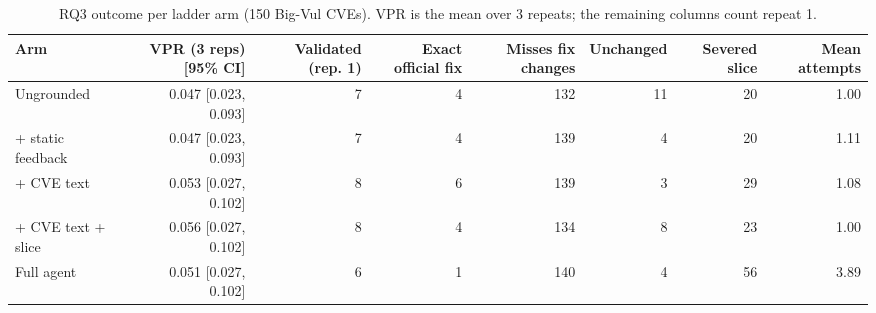\begin{table}[t]
\centering\small
\caption{RQ3 outcome per ladder arm (150 Big-Vul CVEs). VPR is the mean over 3 repeats; the remaining columns count repeat 1.}
\label{tab:t4}
\begin{tabular}{lrrrrrrr}
\toprule
Arm & VPR (3 reps) [95\% CI] & Validated (rep. 1) & Exact official fix & Misses fix changes & Unchanged & Severed slice & Mean attempts \\
\midrule
Ungrounded & 0.047 [0.023, 0.093] & 7 & 4 & 132 & 11 & 20 & 1.00 \\
+ static feedback & 0.047 [0.023, 0.093] & 7 & 4 & 139 & 4 & 20 & 1.11 \\
+ CVE text & 0.053 [0.027, 0.102] & 8 & 6 & 139 & 3 & 29 & 1.08 \\
+ CVE text + slice & 0.056 [0.027, 0.102] & 8 & 4 & 134 & 8 & 23 & 1.00 \\
Full agent & 0.051 [0.027, 0.102] & 6 & 1 & 140 & 4 & 56 & 3.89 \\
\bottomrule
\end{tabular}
\end{table}
